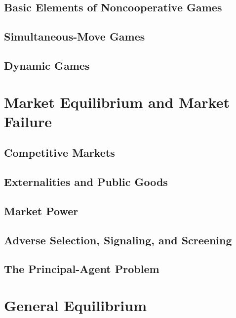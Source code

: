 \documentclass{report} %
\theoremstyle{definition}
\begin{document}
\chapter{Basic Elements of Noncooperative Games}


\chapter{Simultaneous-Move Games}


\chapter{Dynamic Games}



\part{Market Equilibrium and Market Failure}

\chapter{Competitive Markets}


\chapter{Externalities and Public Goods}


\chapter{Market Power}


\chapter{Adverse Selection, Signaling, and Screening}


\chapter{The Principal-Agent Problem}



\part{General Equilibrium}
\end{document}
